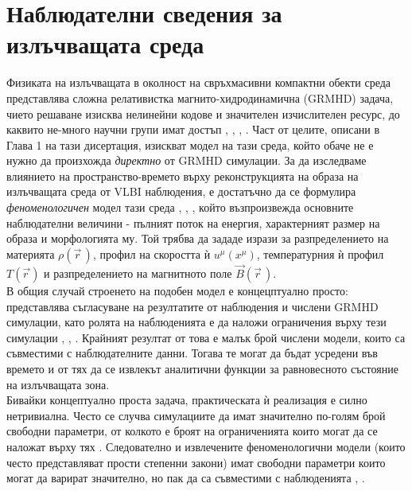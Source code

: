 \section{Наблюдателни сведения за излъчващата среда}

Физиката на излъчващата в околност на свръхмасивни компактни обекти среда представлява сложна релативистка магнито-хидродинамична (GRMHD) задача, чието решаване изисква нелинейни кодове и значителен изчислителен ресурс, до каквито не-много научни групи имат достъп \cite{Yao2021}, \cite{Anantua2024}, \cite{Davelaar2019}, \cite{Davis2020}. Част от целите, описани в Глава 1 на тази дисертация, изискват модел на тази среда, който обаче не е нужно да произхожда \emph{директно} от GRMHD симулации. За да изследваме влиянието на пространство-времето върху реконструкцията на образа на излъчващата среда от VLBI наблюдения, е достатъчно да се формулира \emph{феноменологичен} модел тази среда \cite{Chatterjee2022}, \cite{Yuan2003}, \cite{Broderick2005}, който възпроизвежда основните наблюдателни величини - пълният поток на енергия, характерният размер на образа и морфологията му. Той трябва да зададе изрази за разпределението на материята $\rho(\vec{r}\,)$, профил на скоростта ѝ $u^\mu (x^\mu)$, температурния ѝ профил $T(\vec{r\,})$ и разпределението на магнитното поле $\vec{B}(\vec{r}\,)$.\\

В общия случай строенето на подобен модел е концецптуално просто: представлява съгласуване на резултатите от наблюдения и числени GRMHD симулации, като ролята на наблюденията е да наложи ограничения върху тези симулации \cite{EHT_SGR_V}, \cite{EHT_SGR_VII}, \cite{EHT_SGR_VIII} . Крайният резултат от това е малък брой числени модели, които са съвместими с наблюдателните данни. Тогава те могат да бъдат усредени във времето и от тях да се извлекът аналитични функции за равновесното състояние на излъчващата зона.\\ 

Бивайки концептуално проста задача, практическата ѝ реализация е силно нетривиална. Често се случва симулациите да имат значително по-голям брой свободни параметри, от колкото е броят на ограниченията които могат да се наложат върху тях \cite{EHT_M87_IX}. Следователно и извлечените феноменологични модели (които често представляват прости степенни закони) имат свободни параметри които могат да варират значително, но пак да са съвместими с наблюденията \cite{Gold2020}, \cite{Broderick2021}.\\

